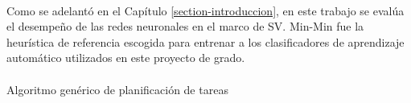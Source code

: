 \paragraph{}Como se adelantó en el Capítulo \ref{section-introduccion}, en este trabajo se evalúa el desempeño de las redes neuronales en el marco de SV.
Min-Min fue la heurística de referencia escogida para entrenar a los clasificadores de aprendizaje automático utilizados en este proyecto de grado.
 
 
 \paragraph{}
 \SetEndCharOfAlgoLine{}
 \begin{algorithm}[H]
\SetAlgoLined
{}
 \caption{Algoritmo genérico de planificación de tareas} \label{algorithm:planificacion-tareas}
\end{algorithm}